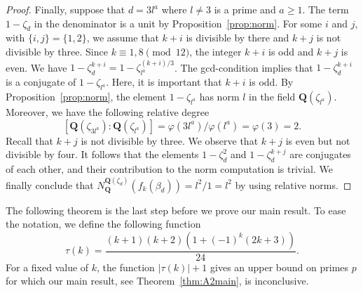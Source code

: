 \documentclass{amsart}
\newcommand{\Q}{\mathbf Q}
\newcommand{\cycl}[1]{\Q(\zeta_{#1})}
\numberwithin{equation}{section}
\theoremstyle{plain}
\theoremstyle{definition}
\begin{document}
\begin{proof}
Finally, suppose that $d=3l^a$ where $l\neq3$ is a prime and $a\geq1$. The term $1-\zeta_d$ in the denominator is a unit by Proposition~\ref{prop:norm}. For some $i$ and $j$, with $\{i,j\}=\{1,2\}$, we assume that $k+i$ is divisible by there and $k+j$ is not divisible by three. Since $k\equiv1,8\pmod{12}$, the integer $k+i$ is odd and $k+j$ is even. We have $1-\zeta_d^{k+i} = 1-\zeta_{l^a}^{(k+i)/3}$. The gcd-condition implies that $1-\zeta_d^{k+i}$ is a conjugate of $1-\zeta_{l^a}$. Here, it is important that $k+i$ is odd. By Proposition~\ref{prop:norm}, the element $1-\zeta_{l^a}$  has norm $l$ in the field $\cycl{l^a}$. Moreover, we have the following relative degree
$$[\cycl{3l^a}:\cycl{l^a}] = \varphi(3l^a)/\varphi(l^a) = \varphi(3) = 2.$$
Recall that $k+j$ is not divisible by three. We observe that $k+j$ is even but not divisible by four. It follows that the elements $1-\zeta_d^2$ and $1-\zeta_d^{k+j}$ are conjugates of each other, and their contribution to the norm computation is trivial. We finally conclude that $N_{\Q}^{\Q(\zeta_d)}\left(f_k(\beta_d)\right) = l^2/1 = l^2$ by using relative norms.
\end{proof}

The following theorem is the last step before we prove our main result. To ease the notation, we define the following function
\begin{equation}\label{eq:tau}
	\tau(k)=\frac{(k+1)(k+2)\left(1+(-1)^k(2k+3)\right)}{24}.
\end{equation}
For a fixed value of $k$, the function $|\tau(k)|+1$ gives an upper bound on primes $p$ for which our main result, see Theorem~\ref{thm:A2main}, is inconclusive. 
\end{document}

